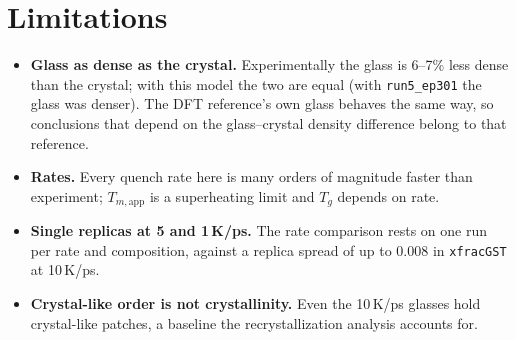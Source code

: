 \documentclass[11pt]{article}
\newcommand{\runfive}{\texttt{run5\_ep301}}
\begin{document}
\section{Limitations}
\begin{itemize}
\item \textbf{Glass as dense as the crystal.} Experimentally the glass is 6--7\% less dense than the crystal; with
this model the two are equal (with \runfive{} the glass was denser). The DFT reference's own glass behaves the same
way, so conclusions that depend on the glass--crystal density difference belong to that reference.
\item \textbf{Rates.} Every quench rate here is many orders of magnitude faster than experiment; $T_{m,\text{app}}$
is a superheating limit and $T_g$ depends on rate.
\item \textbf{Single replicas at 5 and 1\,K/ps.} The rate comparison rests on one run per rate and composition,
against a replica spread of up to 0.008 in \texttt{xfracGST} at 10\,K/ps.
\item \textbf{Crystal-like order is not crystallinity.} Even the 10\,K/ps glasses hold crystal-like patches, a
baseline the recrystallization analysis accounts for.
\end{itemize}
\end{document}
